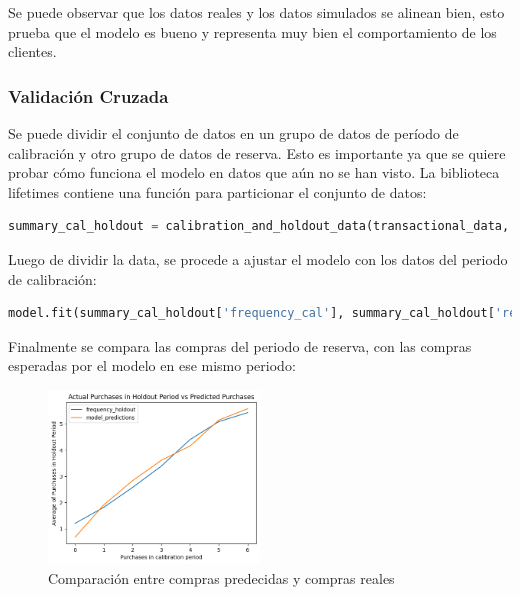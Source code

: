 Se puede observar que los datos reales y los datos simulados se alinean bien, esto prueba que el modelo es bueno y representa muy bien el comportamiento de los clientes.

\subsubsection{Validación Cruzada}

Se puede dividir el conjunto de datos en un grupo de datos de período de calibración y otro grupo de datos de reserva. Esto es importante ya que se quiere probar cómo funciona el modelo en datos que aún no se han visto. La biblioteca lifetimes contiene una función para particionar el conjunto de datos:

\begin{lstlisting}[language=Python, caption=Validación en modelo.ipynb]
summary_cal_holdout = calibration_and_holdout_data(transactional_data, 'CustomerNo', 'Date',                                            calibration_period_end='2019-06-09', observation_period_end='2019-12-09')
\end{lstlisting}

Luego de dividir la data, se procede a ajustar el modelo con los datos del periodo de calibración:

\begin{lstlisting}[language=Python, caption=Validación en modelo.ipynb]
model.fit(summary_cal_holdout['frequency_cal'], summary_cal_holdout['recency_cal'], summary_cal_holdout['T_cal'])
\end{lstlisting}

Finalmente se compara las compras del periodo de reserva, con las compras esperadas por el modelo en ese mismo periodo:

\begin{figure}[H]
	\centering \includegraphics[width=0.50\textwidth]{images/comparacion.png}
	\caption{Comparación entre compras predecidas y compras reales}
	\label{fig:comp}
\end{figure}

